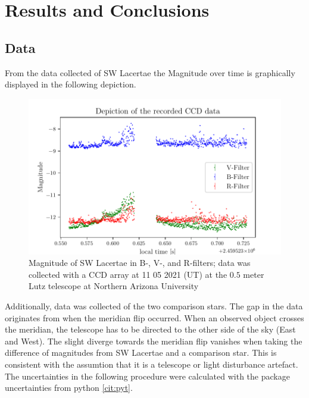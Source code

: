 \section{Results and Conclusions}
\label{sec:make}

\subsection{Data}
  \label{sec:America}
  From the data collected of SW Lacertae the Magnitude over time is graphically displayed in the following depiction.
  \begin{figure}[H]
    \centering
    \includegraphics{Magnitude.pdf}
    \caption{Magnitude of SW Lacertae in B-, V-, and R-filters; 
    data was collected with a CCD array at 11 05 2021 (UT) at the $0.5$ meter Lutz telescope
    at Northern Arizona University}
  \end{figure}
  \noindent Additionally, data was collected of the two comparison stars. The gap in the data originates from when
  the meridian flip occurred. When an observed object crosses the meridian, the telescope has to be directed 
  to the other side of the sky (East and West). The slight diverge towards the meridian flip vanishes when taking the 
  difference of magnitudes from SW Lacertae and a comparison star. This is consistent with the 
  assumtion that it is a telescope or light disturbance artefact.\\
  \noindent The uncertainties in the following procedure were calculated with the package 
  uncertainties from python \ref{cit:pyt}.

